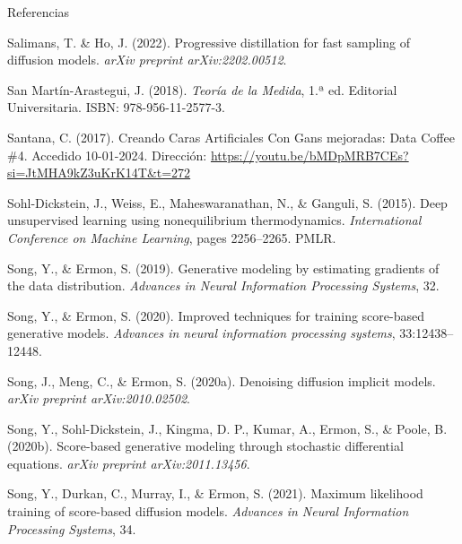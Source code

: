 \documentclass[aspectratio=169,xcolor=dvipsnames, t, spanish]{beamer}
\begin{document}
\begin{frame}{Referencias}
{\begin{thebibliography}{99}
             Salimans, T. \& Ho, J. (2022).
            \newblock Progressive distillation for fast sampling of diffusion models.
            \newblock \emph{arXiv preprint arXiv:2202.00512}.
            
             San Martín-Arastegui, J. (2018).
            \newblock \emph{Teoría de la Medida}, 1.ª ed.
            \newblock Editorial Universitaria. ISBN: 978-956-11-2577-3.

             Santana, C. (2017).
            \newblock Creando Caras Artificiales Con Gans mejoradas: Data Coffee \#4.
            \newblock Accedido 10-01-2024. Dirección: \url{https://youtu.be/bMDpMRB7CEs?si=JtMHA9kZ3uKrK14T&t=272}

             Sohl-Dickstein, J., Weiss, E., Maheswaranathan, N., \& Ganguli, S. (2015).
            \newblock Deep unsupervised learning using nonequilibrium thermodynamics.
            \newblock \emph{International Conference on Machine Learning}, pages 2256–2265. PMLR.

             Song, Y., \& Ermon, S. (2019).
            \newblock Generative modeling by estimating gradients of the data distribution.
            \newblock \emph{Advances in Neural Information Processing Systems}, 32.

             Song, Y., \& Ermon, S. (2020).
            \newblock Improved techniques for training score-based generative models.
            \newblock \emph{Advances in neural information processing systems}, 33:12438–12448.

             Song, J., Meng, C., \& Ermon, S. (2020a).
            \newblock Denoising diffusion implicit models.
            \newblock \emph{arXiv preprint arXiv:2010.02502}.

             Song, Y., Sohl-Dickstein, J., Kingma, D. P., Kumar, A., Ermon, S., \& Poole, B. (2020b).
            \newblock Score-based generative modeling through stochastic differential equations.
            \newblock \emph{arXiv preprint arXiv:2011.13456}.

             Song, Y., Durkan, C., Murray, I., \& Ermon, S. (2021).
            \newblock Maximum likelihood training of score-based diffusion models.
            \newblock \emph{Advances in Neural Information Processing Systems}, 34.
            

\end{thebibliography}}
\end{frame}
\end{document}
